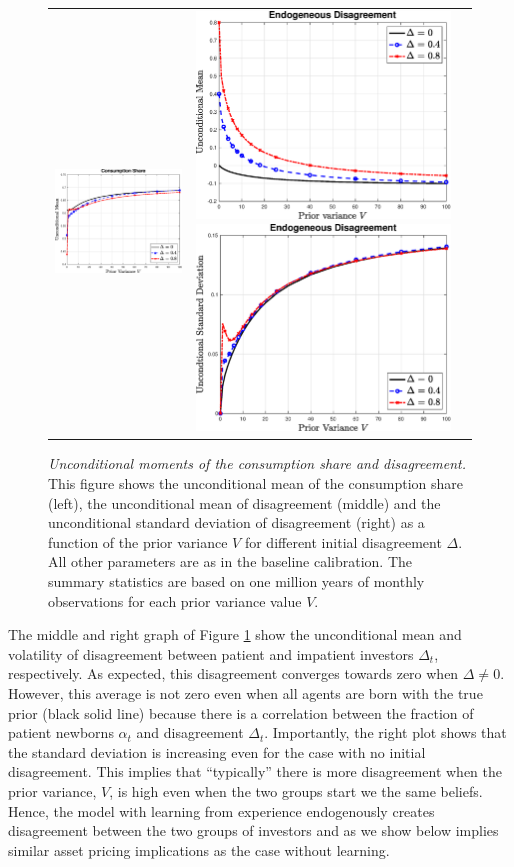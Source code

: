 \begin{figure}[htbp] 
\centering
\vspace{0.1in}
\begin{tabular}{ccc}
\includegraphics[width=.3\textwidth]{figures/FigLearning_f_v1.eps} &
\includegraphics[width=.3\textwidth]{figures/FigLearning_DeltaM_v1.eps}
\includegraphics[width=.3\textwidth]{figures/FigLearning_DeltaSTD_v1.eps}
\end{tabular}
\caption{\emph{Unconditional moments of the consumption share and disagreement.} \footnotesize{This figure shows the unconditional mean of the consumption share (left), the unconditional mean of disagreement (middle) and the unconditional standard deviation of disagreement (right) as a function of the prior variance $V$ for different initial disagreement $\Delta$. All other parameters are as in the baseline calibration. The summary statistics are based on one million years of monthly observations for each prior variance value $V$.}} \label{CshareandDislearning} %
\end{figure}
 
The middle and right graph of Figure \ref{CshareandDislearning} show the unconditional mean and volatility of disagreement between patient and impatient investors $\Delta_t$, respectively. %
As expected, this disagreement converges towards zero when $\Delta \neq 0$. However, this average is not zero even when all agents are born with the true prior (black solid line) because there is a correlation between the fraction of patient newborns $\alpha_t$ and disagreement $\Delta_t$. Importantly, the right plot shows that the standard deviation is increasing even for the case with no initial disagreement. This implies that ``typically'' there is more disagreement when the prior variance, $V$, is high even when the two groups start we the same beliefs. Hence, the model with learning from experience endogenously creates disagreement between the two groups of investors and as we show below implies similar asset pricing implications as the case without learning.  


